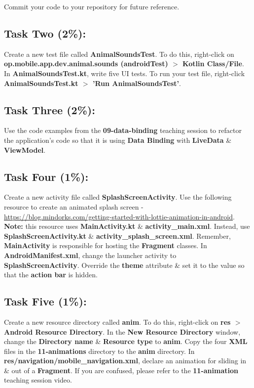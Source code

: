 \documentclass{article}
\begin{document}
Commit your code to your repository for future reference.

\subsection*{Task Two (2\%):}
Create a new test file called \textbf{AnimalSoundsTest}. To do this, right-click on \textbf{op.mobile.app.dev.animal.sounds (androidTest) $>$ Kotlin Class/File}. In \textbf{AnimalSoundsTest.kt}, write five UI tests. To run your test file, right-click \textbf{AnimalSoundsTest.kt $>$ 'Run AnimalSoundsTest'}.

\subsection*{Task Three (2\%):}
Use the code examples from the \textbf{09-data-binding} teaching session to refactor the application's code so that it is using \textbf{Data Binding} with \textbf{LiveData} \& \textbf{ViewModel}. 

\subsection*{Task Four (1\%):}
Create a new activity file called \textbf{SplashScreenActivity}. Use the following resource to create an animated splash screen - \href{https://blog.mindorks.com/getting-started-with-lottie-animation-in-android}{https://blog.mindorks.com/getting-started-with-lottie-animation-in-android}. \textbf{Note:} this resource uses \textbf{MainActivity.kt} \& \textbf{activity\_main.xml}. Instead, use \textbf{SplashScreenActivity.kt} \& \textbf{activity\_splash\_screen.xml}. Remember, \textbf{MainActivity} is responsible for hosting the \textbf{Fragment} classes. In \textbf{AndroidManifest.xml}, change the launcher activity to \textbf{SplashScreenActivity}. Override the \textbf{theme} attribute \& set it to the value so that the \textbf{action bar} is hidden. 

\subsection*{Task Five (1\%):}
Create a new resource directory called \textbf{anim}. To do this, right-click on \textbf{res $>$ Android Resource Directory}. In the \textbf{New Resource Directory} window, change the \textbf{Directory name} \& \textbf{Resource type} to \textbf{anim}. Copy the four \textbf{XML} files in the \textbf{11-animations} directory to the \textbf{anim} directory. In \textbf{res/navigation/mobile\_navigation.xml}, declare an animation for sliding in \& out of a \textbf{Fragment}. If you are confused, please refer to the \textbf{11-animation} teaching session video.
\end{document}
